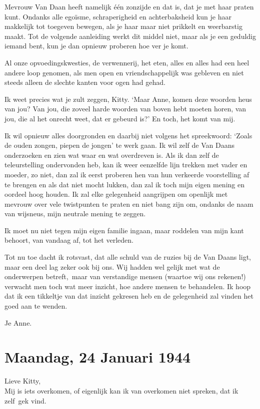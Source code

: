 \documentclass{book}
\begin{document}
Mevrouw Van Daan heeft namelijk één zonzijde en dat is, dat je met haar praten
kunt. Ondanks alle egoïsme, schraperigheid en achterbaksheid kun je haar
makkelijk tot toegeven bewegen, als je haar maar niet prikkelt en weerbarstig
maakt. Tot de volgende aanleiding werkt dit middel niet, maar als je een
geduldig iemand bent, kun je dan opnieuw proberen hoe ver je komt.

Al onze opvoedingskwesties, de verwennerij, het eten, alles en alles had een
heel andere loop genomen, als men open en vriendschappelijk was gebleven en niet
steeds alleen de slechte kanten voor ogen had gehad.

Ik weet precies wat je zult zeggen, Kitty. `Maar Anne, komen deze woorden heus
van jou? Van jou, die zoveel harde woorden van boven hebt moeten horen, van jou,
die al het onrecht weet, dat er gebeurd is?' En toch, het komt van mij.

Ik wil opnieuw alles doorgronden en daarbij niet volgens het spreekwoord: `Zoals
de ouden zongen, piepen de jongen' te werk gaan. Ik wil zelf de Van Daans
onderzoeken en zien wat waar en wat overdreven is.  Als ik dan zelf de
teleurstelling ondervonden heb, kan ik weer eenzelfde lijn trekken met vader en
moeder, zo niet, dan zal ik eerst proberen hen van hun verkeerde voorstelling af
te brengen en als dat niet mocht lukken, dan zal ik toch mijn eigen mening en
oordeel hoog houden. Ik zal elke gelegenheid aangrijpen om openlijk met mevrouw
over vele twistpunten te praten en niet bang zijn om, ondanks de naam van
wijsneus, mijn neutrale mening te zeggen.

Ik moet nu niet tegen mijn eigen familie ingaan, maar roddelen van mijn kant
behoort, van vandaag af, tot het verleden.

Tot nu toe dacht ik rotsvast, dat alle schuld van de ruzies bij de Van Daans
ligt, maar een deel lag zeker ook bij ons. Wij hadden wel gelijk met wat de
onderwerpen betreft,~maar van verstandige mensen (waartoe wij ons rekenen!)
verwacht men toch wat meer inzicht, hoe andere mensen te behandelen. Ik hoop dat
ik een tikkeltje van dat inzicht gekresen heb en de gelegenheid zal vinden het
goed aan te wenden.

Je Anne.

\section*{Maandag, 24 Januari 1944}

Lieve Kitty,\\
Mij is iets overkomen, of eigenlijk kan ik van overkomen niet
spreken, dat ik zelf~gek vind.
\end{document}
